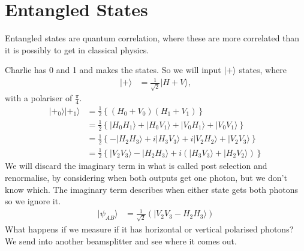 \documentclass[a4paper, 11pt, normalem]{report}
\begin{document}
\section{Entangled States}
Entangled states are quantum correlation, where these are more correlated than it is possibly to get in classical physics.
\begin{figure}[H]
    \centering
\end{figure}
Charlie has 0 and 1 and makes the states. 
So we will input $|+\rangle$ states, where
\begin{align}
    |+\rangle &= \frac{1}{\sqrt 2}|H+V\rangle,
\end{align}
with a polariser of $\frac{\pi}{4}$.
\begin{align}
    |+_0\rangle|+_1\rangle &= \frac12\left\{(H_0+V_0)(H_1+V_1)\right\} \\
                           &= \frac12\left\{|H_0H_1\rangle + |H_0V_1\rangle + |V_0H_1\rangle + |V_0V_1\rangle\right\} \\
                           &= \frac12\left\{-|H_2H_3\rangle+i|H_3V_3\rangle + i|V_2H_2\rangle + |V_2V_3\rangle\right\} \\
                           &= \frac12\left\{|V_2V_3\rangle-|H_2H_3\rangle+i(|H_3V_3\rangle+|H_2V_2\rangle)\right\}
\end{align}
We will discard the imaginary term in what is called post selection and renormalise, by considering when both outputs get one photon, but we don't know which. The imaginary term describes when either state gets both photons so we ignore it. 
\begin{align}
    |\psi_{AB}\rangle &= \frac{1}{\sqrt2}\left(|V_2V_3-H_2H_3\rangle\right)
\end{align}
What happens if we measure if it has horizontal or vertical polarised photons?
We send into another beamsplitter and see where it comes out. 
\begin{figure}[H]
    \centering
\end{figure}
\end{document}
